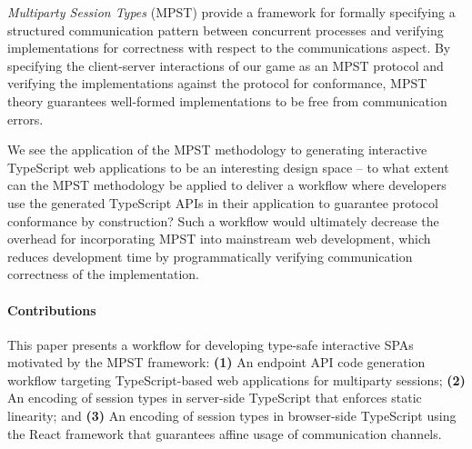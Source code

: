 \textit{Multiparty Session Types} (MPST) \cite{MPST} provide a framework for
formally specifying a structured communication pattern between concurrent
processes and verifying implementations for correctness with respect to the
communications aspect.
By specifying the client-server interactions of our game as an MPST protocol
and verifying the implementations against the protocol for conformance,
MPST theory guarantees well-formed implementations to be free from
communication errors.

We see the application of the MPST methodology to generating interactive 
TypeScript web applications to be an interesting design space 
-- to what extent can the MPST methodology be applied to
deliver a workflow where developers use the generated TypeScript APIs in
their application to guarantee protocol conformance by construction?
Such a workflow would ultimately decrease the overhead for incorporating MPST
into mainstream web development, which reduces development time by programmatically
verifying communication correctness of the implementation.



\paragraph{Contributions}
This paper presents a workflow for developing type-safe interactive SPAs
motivated by the MPST framework:
\textbf{(1)} An endpoint API code generation
workflow targeting TypeScript-based web applications for multiparty sessions;
\textbf{(2)} An encoding of session types in server-side TypeScript that
enforces static linearity;
and \textbf{(3)} An encoding of session types in
browser-side TypeScript using the React framework that guarantees affine usage
of communication channels.


